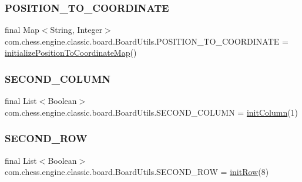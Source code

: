 \subsubsection{\texorpdfstring{POSITION\_TO\_COORDINATE}{POSITION\_TO\_COORDINATE}}
{\footnotesize\ttfamily final Map$<$String, Integer$>$ com.\+chess.\+engine.\+classic.\+board.\+Board\+Utils.\+P\+O\+S\+I\+T\+I\+O\+N\+\_\+\+T\+O\+\_\+\+C\+O\+O\+R\+D\+I\+N\+A\+TE = \mbox{\hyperlink{enumcom_1_1chess_1_1engine_1_1classic_1_1board_1_1_board_utils_a77b348bf1e79db761e1e96e5de3d238f}{initialize\+Position\+To\+Coordinate\+Map}}()}

\mbox{\label{enumcom_1_1chess_1_1engine_1_1classic_1_1board_1_1_board_utils_ad9318357de9002219841e8ff2e719b68}} 
\subsubsection{\texorpdfstring{SECOND\_COLUMN}{SECOND\_COLUMN}}
{\footnotesize\ttfamily final List$<$Boolean$>$ com.\+chess.\+engine.\+classic.\+board.\+Board\+Utils.\+S\+E\+C\+O\+N\+D\+\_\+\+C\+O\+L\+U\+MN = \mbox{\hyperlink{enumcom_1_1chess_1_1engine_1_1classic_1_1board_1_1_board_utils_a93ed19969015a1b866999ea08fa43cb3}{init\+Column}}(1)}

\mbox{\label{enumcom_1_1chess_1_1engine_1_1classic_1_1board_1_1_board_utils_a3c1a7fcc84271e55b800fe70509db389}} 
\subsubsection{\texorpdfstring{SECOND\_ROW}{SECOND\_ROW}}
{\footnotesize\ttfamily final List$<$Boolean$>$ com.\+chess.\+engine.\+classic.\+board.\+Board\+Utils.\+S\+E\+C\+O\+N\+D\+\_\+\+R\+OW = \mbox{\hyperlink{enumcom_1_1chess_1_1engine_1_1classic_1_1board_1_1_board_utils_a00765a9cb8974e6e54dfa2cb25de687b}{init\+Row}}(8)}

